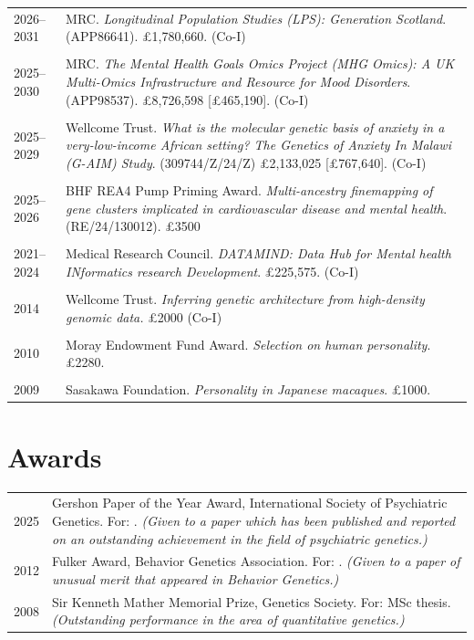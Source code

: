 \documentclass[11pt]{article}
\begin{document}
\begin{tabular}{p{3cm}p{12cm}}

2026--2031 & MRC. \emph{Longitudinal Population Studies (LPS): Generation Scotland}. (APP86641). £1,780,660. (Co-I) \\ \\

2025--2030 & MRC. \emph{The Mental Health Goals Omics Project (MHG Omics): A UK Multi-Omics Infrastructure and Resource for Mood Disorders}. (APP98537). £8,726,598 [£465,190]. (Co-I) \\ \\
  
2025--2029 & Wellcome Trust. \emph{What is the molecular genetic basis of anxiety in a very-low-income African setting? The Genetics of Anxiety In Malawi (G-AIM) Study}. (309744/Z/24/Z) £2,133,025 [£767,640]. (Co-I) \\ \\

2025--2026 & BHF REA4 Pump Priming Award. \emph{Multi-ancestry finemapping of gene clusters implicated in cardiovascular disease and mental health}. (RE/24/130012). £3500 \\ \\

2021--2024 & Medical Research Council. \emph{DATAMIND: Data Hub for Mental health INformatics research Development}. £225,575. (Co-I) \\ \\

2014 & Wellcome Trust. \emph{Inferring genetic architecture from high-density genomic data.} £2000 (Co-I) \\ \\

2010 & Moray Endowment Fund Award. \emph{Selection on human personality}. £2280. \\ \\

2009 & Sasakawa Foundation. \emph{Personality in Japanese macaques}. £1000.

\end{tabular}

\section*{Awards}

\begin{tabular}{p{3cm}p{12cm}}

2025 & Gershon Paper of the Year Award, International Society of Psychiatric Genetics. For: \cite{Adams_MDD2025_Cell}. \emph{(Given to a paper which has been published and reported on an outstanding achievement in the field of psychiatric genetics.)} \\
2012 & Fulker Award, Behavior Genetics Association. For: \cite{adams.a.weiss.m.majority}. \emph{(Given to a paper of unusual merit that appeared in Behavior Genetics.)} \\
2008 & Sir Kenneth Mather Memorial Prize, Genetics Society. For: MSc thesis. \emph{(Outstanding performance in the area of quantitative genetics.)}

\end{tabular}
\end{document}
